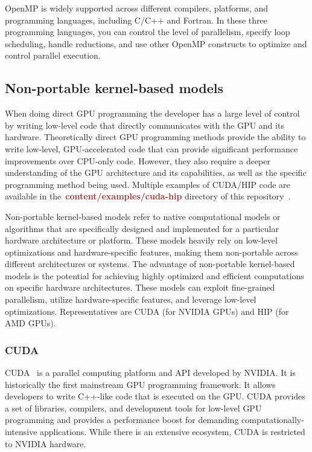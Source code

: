\par
OpenMP is widely supported across different compilers, platforms, and programming languages, including C/C++ and Fortran.
In these three programming languages, you can control the level of parallelism, specify loop scheduling, handle reductions, and use other OpenMP constructs to optimize and control parallel execution.




\subsection{Non-portable kernel-based models}


\par
When doing direct GPU programming the developer has a large level of control by writing low-level code that directly communicates with the GPU and its hardware.
Theoretically direct GPU programming methods provide the ability to write low-level, GPU-accelerated code that can provide significant performance improvements over CPU-only code.
However, they also require a deeper understanding of the GPU architecture and its capabilities, as well as the specific programming method being used.
Multiple examples of CUDA/HIP code are available in the~\textbf{\textcolor{brown}{content/examples/cuda-hip}} directory of this repository~\cite{gpu-programming-examples}.


\par
Non-portable kernel-based models refer to native computational models or algorithms that are specifically designed and implemented for a particular hardware architecture or platform.
These models heavily rely on low-level optimizations and hardware-specific features, making them non-portable across different architectures or systems.
The advantage of non-portable kernel-based models is the potential for achieving highly optimized and efficient computations on specific hardware architectures.
These models can exploit fine-grained parallelism, utilize hardware-specific features, and leverage low-level optimizations.
Representatives are CUDA (for NVIDIA GPUs) and HIP (for AMD GPUs).


\subsubsection{CUDA}

\par
CUDA~\cite{cuda} is a parallel computing platform and API developed by NVIDIA.
It is historically the first mainstream GPU programming framework.
It allows developers to write C++-like code that is executed on the GPU.
CUDA provides a set of libraries, compilers, and development tools for low-level GPU programming and provides a performance boost for demanding computationally-intensive applications.
While there is an extensive ecosystem, CUDA is restricted to NVIDIA hardware.


